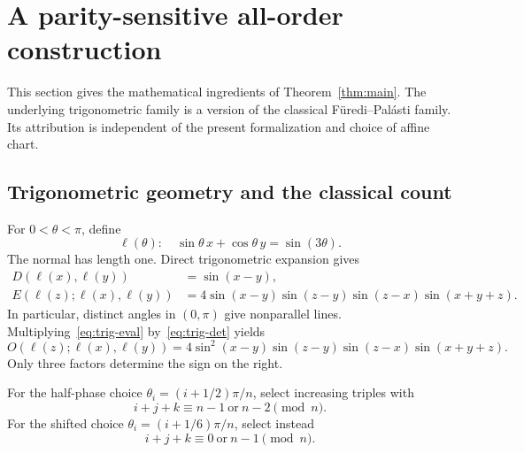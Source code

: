 \section{A parity-sensitive all-order construction}\label{sec:universal}

This section gives the mathematical ingredients of Theorem~\ref{thm:main}. The underlying trigonometric family is a version of the classical F\"uredi--Pal\'asti family. Its attribution is independent of the present formalization and choice of affine chart.

\subsection{Trigonometric geometry and the classical count}

For $0<\theta<\pi$, define
\begin{equation}\label{eq:trig-line}
\ell(\theta):\quad \sin\theta\,x+\cos\theta\,y=\sin(3\theta).
\end{equation}
The normal has length one. Direct trigonometric expansion gives
\begin{align}
D(\ell(x),\ell(y))&=\sin(x-y),\label{eq:trig-det}\\
E(\ell(z);\ell(x),\ell(y))
&=4\sin(x-y)\sin(z-y)\sin(z-x)\sin(x+y+z).\label{eq:trig-eval}
\end{align}
In particular, distinct angles in $(0,\pi)$ give nonparallel lines. Multiplying~\eqref{eq:trig-eval} by~\eqref{eq:trig-det} yields
\begin{equation}\label{eq:trig-oriented}
O(\ell(z);\ell(x),\ell(y))=
4\sin^2(x-y)\sin(z-y)\sin(z-x)\sin(x+y+z).
\end{equation}
Only three factors determine the sign on the right.

For the half-phase choice $\theta_i=(i+1/2)\pi/n$, select increasing triples with
\begin{equation}\label{eq:halfphase-triples}
i+j+k\equiv n-1\ \text{or}\ n-2\pmod n.
\end{equation}
For the shifted choice $\theta_i=(i+1/6)\pi/n$, select instead
\begin{equation}\label{eq:shifted-triples}
i+j+k\equiv0\ \text{or}\ n-1\pmod n.
\end{equation}

